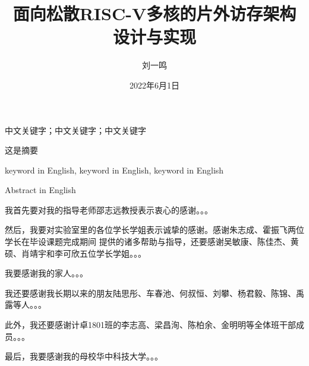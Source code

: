 \documentclass[supercite,notofont]{HustGraduPaper}
\title{面向松散RISC-V多核的片外访存架构设计与实现}
\author{刘一鸣}
\date{2022年6月1日}
\begin{document}


\maketitle

\statement

\clearpage


\begin{cnabstract}{中文关键字；中文关键字；中文关键字}


这是摘要

\end{cnabstract}

\begin{enabstract}{keyword in English, keyword in English, keyword in English}


Abstract in English

\end{enabstract}

\tableofcontents[level=2]

\clearpage







% 

\begin{thankpage}


我首先要对我的指导老师邵志远教授表示衷心的感谢。。。

然后，我要对实验室里的各位学长学姐表示诚挚的感谢。感谢朱志成、霍振飞两位学长在毕设课题完成期间
提供的诸多帮助与指导，还要感谢吴敏康、陈佳杰、黄硕、肖靖宇和李可欣五位学长学姐。。。

我要感谢我的家人。。。

我还要感谢我长期以来的朋友陆思彤、车春池、何叔恒、刘攀、杨君毅、陈锦、禹露等人。。。

此外，我还要感谢计卓1801班的李志高、梁昌洵、陈柏余、金明明等全体班干部成员。。。

最后，我要感谢我的母校华中科技大学。。。


\end{thankpage}


\end{document}
